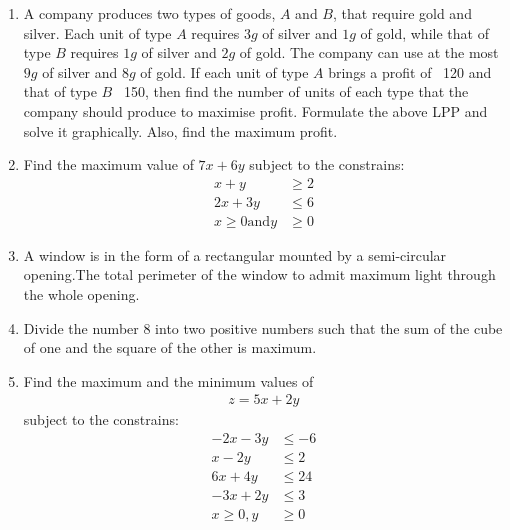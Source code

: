 \begin{enumerate}
  
\item A company produces two types of goods, $A$ and $B$, that require gold and
silver. Each unit of type $A$ requires $3g$ of silver and $1g$ of gold, while that of type $B$ requires $1g$ of silver and $2g$ of gold. The company can use at
the most $9g$ of silver and $8g$ of gold. If each unit of type $A$ brings a profit
of \rupee~120 and that of type $B$ \rupee~150, then find the number of units of each type that the company should produce to maximise profit. Formulate the above LPP and solve it graphically. Also, find the maximum profit.
\item Find the maximum value of $7x+6y$ subject to the constrains:
\begin{align}
	x+y &\geq   2\\
	2x+3y &\leq 6\\
	x \geq 0 \text{and} y &\geq 0
\end{align}
\item A window is in the form of a rectangular mounted by a semi-circular opening.The total perimeter of the window to admit maximum light through the whole opening.
\item Divide the number $8$ into two positive numbers such that the sum of the cube of one and the square of the other is maximum.
\item Find the maximum and the minimum values of 
\begin{align}
       z=5x+2y 
\end{align}	
		subject to the constrains:
\begin{align}
	-2x-3y &\leq -6\\
	x-2y &\leq 2\\
	6x+4y &\leq 24\\
	-3x+2y &\leq 3\\
	x \geq 0, y &\geq 0
\end{align}
 

\end{enumerate}
